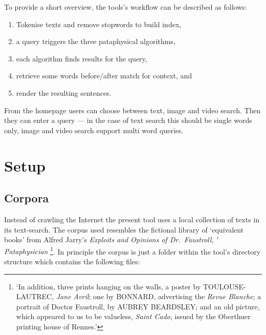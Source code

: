 
\begin{fcom}
  To provide a short overview, the tools’s workflow can be described as follows:
  \begin{enumerate}
    \item Tokenise texts and remove stopwords to build index,
    \item a query triggers the three pataphysical algorithms,
    \item each algorithm finds results for the query,
    \item retrieve some words before/after match for context, and
    \item render the resulting sentences.
  \end{enumerate}
\end{fcom}


From the homepage users can choose between text, image and video search. Then they can enter a query --- in the case of text search this should be single words only, image and video search support multi word queries.


\section{Setup}

\subsection{Corpora}
\label{s:corpora}

Instead of crawling the Internet the present tool uses a local collection of texts in its text-search. The corpus used resembles the fictional library of `equivalent books' from Alfred Jarry's \emph{Exploits and Opinions of Dr.\ Faustroll, $'$Pataphysician} \citeyear[p.10-12]{Jarry1996}\footnote{`In addition, three prints hanging on the walls, a poster by TOULOUSE-LAUTREC, \emph{Jane Avril}; one by BONNARD, advertising the \emph{Revue Blanche}; a portrait of Doctor Faustroll, by AUBREY BEARDSLEY\@; and an old picture, which appeared to us to be valueless, \emph{Saint Cado}, issued by the Oberthuer printing house of Rennes.'\parencite[p.12]{Jarry1996}}. In principle the \hypertarget{corpus}{corpus}\label{ref:corpus} is just a folder within the tool's directory structure which contains the following files:


